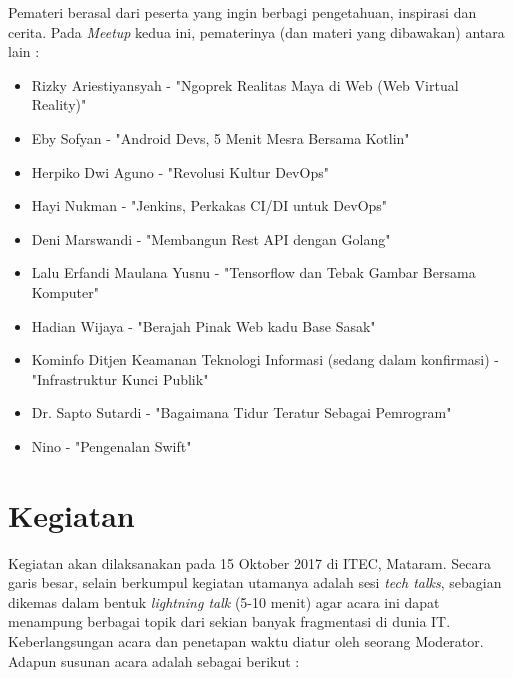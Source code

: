 \documentclass{article}
\begin{document}
Pemateri berasal dari peserta yang ingin berbagi pengetahuan, inspirasi dan cerita. Pada \textit{Meetup} kedua ini, pematerinya (dan materi yang dibawakan) antara lain :
\begin{itemize}
  \item Rizky Ariestiyansyah - "Ngoprek Realitas Maya di Web (Web Virtual Reality)"
  \item Eby Sofyan - "Android Devs, 5 Menit Mesra Bersama Kotlin"
  \item Herpiko Dwi Aguno - "Revolusi Kultur DevOps"
  \item Hayi Nukman - "Jenkins, Perkakas CI/DI untuk DevOps"
  \item Deni Marswandi - "Membangun Rest API dengan Golang"
  \item Lalu Erfandi Maulana Yusnu - "Tensorflow dan Tebak Gambar Bersama Komputer"
  \item Hadian Wijaya - "Berajah Pinak Web kadu Base Sasak"
  \item Kominfo Ditjen Keamanan Teknologi Informasi (sedang dalam konfirmasi) - "Infrastruktur Kunci Publik"
  \item Dr. Sapto Sutardi - "Bagaimana Tidur Teratur Sebagai Pemrogram"
  \item Nino - "Pengenalan Swift"
\end{itemize}

\section{Kegiatan}

Kegiatan akan dilaksanakan pada 15 Oktober 2017 di ITEC, Mataram. Secara garis besar, selain berkumpul kegiatan utamanya adalah sesi \textit{tech talks}, sebagian dikemas dalam bentuk \textit{lightning talk} (5-10 menit) agar acara ini dapat menampung berbagai topik dari sekian banyak fragmentasi di dunia IT. Keberlangsungan acara dan penetapan waktu diatur oleh seorang Moderator. Adapun susunan acara adalah sebagai berikut :
\end{document}
